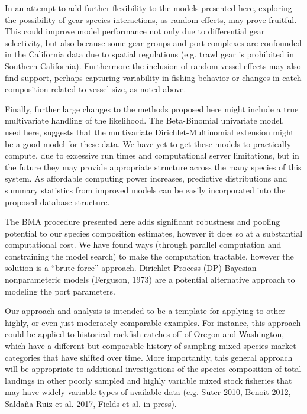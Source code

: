 \documentclass[12pt]{article}
\begin{document}
In an attempt to add further flexibility to the models presented here,
exploring the possibility of gear-species interactions, as random
effects, may prove fruitful. This could improve model performance not only due 
to differential gear selectivity, but also because some gear groups and port 
complexes are confounded in the California data due to spatial regulations 
(e.g. trawl gear is prohibited in Southern California). Furthermore the 
inclusion of random vessel effects may also find support, perhaps capturing 
variability in fishing behavior or changes in catch composition related to 
vessel size, as noted above.

Finally, further large changes to the methods proposed here might include a 
true multivariate handling of the likelihood. The Beta-Binomial univariate 
model, used here, suggests that the multivariate Dirichlet-Multinomial 
extension might be a good model for these data. We have yet to get these 
models to practically compute, due to excessive run times and computational 
server limitations, but in the future they may provide appropriate structure 
across the many species of this system. As affordable computing power 
increases, predictive distributions and summary statistics from improved 
models can be easily incorporated into the proposed database structure.

The BMA procedure presented here adds significant robustness and pooling
potential to our species composition estimates, however it does so at a
substantial computational cost. We have found ways (through parallel
computation and constraining the model search) to make the computation
tractable, however the solution is a ``brute force'' approach. Dirichlet
Process (DP) Bayesian nonparameteric models (Ferguson, 1973) are a 
potential alternative approach to modeling the port parameters.

Our approach and analysis is intended to be a template for applying to other 
highly, or even just moderately comparable examples. For instance, this 
approach could be applied to historical rockfish catches off of Oregon and 
Washington, which have a different but comparable history of sampling 
mixed-species market categories that have shifted over time. More importantly, 
this general approach will be appropriate to additional investigations of 
the species composition of total landings in other poorly sampled and 
highly variable mixed stock fisheries that may have widely variable types 
of available data (e.g. Suter 2010, Benoit 2012, Saldaña-Ruiz et al. 2017,  
Fields et al. in press).
\end{document}
